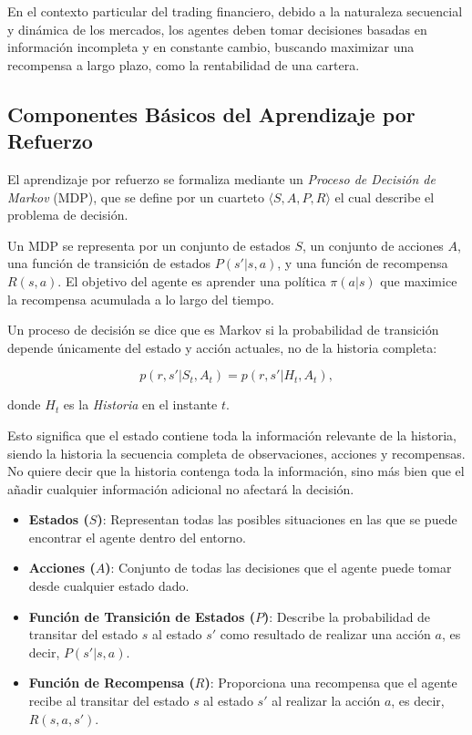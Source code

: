 \documentclass[a4paper,12pt, twoside]{report}
\begin{document}
En el contexto particular del trading financiero, debido a la naturaleza secuencial y dinámica de 
los mercados, los agentes deben tomar decisiones basadas en información incompleta y en constante 
cambio, buscando maximizar una recompensa a largo plazo, como la rentabilidad de una cartera.


\subsection{Componentes Básicos del Aprendizaje por Refuerzo}

El aprendizaje por refuerzo se formaliza mediante un \textit{Proceso de Decisión de Markov} (MDP), 
que se define por un cuarteto \(\langle S, A, P, R \rangle\) el cual describe el problema de decisión.

Un MDP se representa por un conjunto de estados \(S\), 
un conjunto de acciones \(A\), una función de transición de estados \(P(s'|s, a)\), y una función de 
recompensa \(R(s, a)\). El objetivo del agente es aprender una política \(\pi(a|s)\) que maximice la 
recompensa acumulada a lo largo del tiempo.

Un proceso de decisión se dice que es Markov si la probabilidad de transición depende únicamente
del estado y acción actuales, no de la historia completa:

\begin{equation}
p(r, s' | S_t, A_t) = p(r, s' | H_t, A_t),
\end{equation}

donde $H_t$ es la \textit{Historia} en el instante $t$.

Esto significa que el estado contiene toda la información relevante de la historia, siendo la historia 
la secuencia completa de observaciones, acciones y recompensas. No quiere decir que la historia contenga
toda la información, sino más bien que el añadir cualquier información adicional no afectará la decisión.

\begin{itemize}
    \item \textbf{Estados (\(S\))}: Representan todas las posibles situaciones en las que se puede 
    encontrar el agente dentro del entorno.
    \item \textbf{Acciones (\(A\))}: Conjunto de todas las decisiones que el agente puede tomar 
    desde cualquier estado dado.
    \item \textbf{Función de Transición de Estados (\(P\))}: Describe la probabilidad de transitar 
    del estado \(s\) al estado \(s'\) como resultado de realizar una acción \(a\), es decir, \(P(s'|s, a)\).
    \item \textbf{Función de Recompensa (\(R\))}: Proporciona una recompensa que el agente 
    recibe al transitar del estado \(s\) al estado \(s'\) al realizar la acción \(a\), es decir, \(R(s, a, s')\).
\end{itemize}
\end{document}
